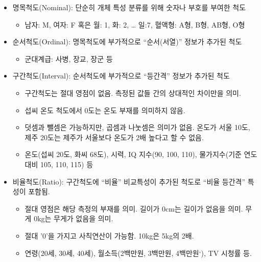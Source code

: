 \documentclass[
  letterpaper,
  chapter,a4paper,showtrims,openright,hidelinks]{oblivoir}
\providecommand{\tightlist}{%
  \setlength{\itemsep}{0pt}\setlength{\parskip}{0pt}}\usepackage{longtable,booktabs,array}
\begin{document}
\begin{itemize}
\tightlist
\item
  명목척도(Nominal): 단순히 개체 특성 분류를 위해 숫자나 부호를 부여한
  척도

  \begin{itemize}
  \tightlist
  \item
    남자: M, 여자: F 혹은 월: 1, 화: 2, \ldots{} 일:7, 혈액형: A형, B형,
    AB형, O형
  \end{itemize}
\item
  순서척도(Ordinal): 명목척도에 부가적으로 ``순서(서열)'' 정보가 추가된
  척도

  \begin{itemize}
  \tightlist
  \item
    군대계급: 사병, 장교, 장군 등
  \end{itemize}
\item
  구간척도(Interval): 순서척도에 부가적으로 ``등간격'' 정보가 추가된
  척도

  \begin{itemize}
  \tightlist
  \item
    구간척도는 절대 영점이 없음. 측정된 값들 간의 상대적인 차이만을
    의미.
  \item
    섭씨 온도 척도에서 0도는 온도 부재를 의미하지 않음.
  \item
    덧셈과 뺄셈은 가능하지만, 곱셈과 나눗셈은 의미가 없음. 온도가 서울
    10도, 제주 20도는 제주가 서울보다 온도가 2배 높다고 할 수 없음.
  \item
    온도(섭씨 20도, 화씨 68도), 시력, IQ 지수(90, 100, 110),
    물가지수(기준 연도 대비 105, 110, 115) 등
  \end{itemize}
\item
  비율척도(Ratio): 구간척도에 ``비율'' 비교특성이 추가된 척도로 ``비율
  등간격'' 특성이 포함됨.

  \begin{itemize}
  \tightlist
  \item
    절대 영점은 해당 측정의 부재를 의미. 길이가 0cm는 길이가 없음을
    의미. 무게 0kg는 무게가 없음을 의미.
  \item
    절대 '0'을 가지고 사칙연산이 가능함. 10kg은 5kg의 2배.
  \item
    연령(20세, 30세, 40세), 월소득(2백만원, 3백만원, 4백만원`), TV
    시청률 등.
  \end{itemize}
\end{itemize}
\end{document}
